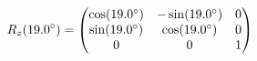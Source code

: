 \documentclass[preview]{standalone}
\begin{document}
\begin{align*}
\special{dvisvgm:raw <g id='unique000'>}R_z(19.0^\circ) = \begin{pmatrix} \cos(19.0^\circ) & -\sin(19.0^\circ) & 0 \\ \sin(19.0^\circ) & \cos(19.0^\circ) & 0 \\ 0 & 0 & 1 \end{pmatrix}\special{dvisvgm:raw </g>}
\end{align*}
\end{document}
